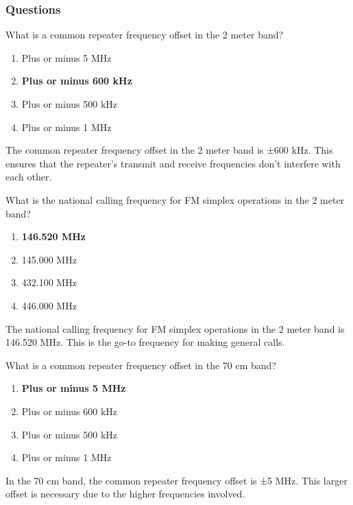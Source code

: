 \subsubsection{Questions}

\begin{tcolorbox}[colback=gray!10!white,colframe=black!75!black,title={T2A01}]
What is a common repeater frequency offset in the 2 meter band?
\begin{enumerate}[label=\Alph*),noitemsep]
    \item Plus or minus 5 MHz
    \item \textbf{Plus or minus 600 kHz}
    \item Plus or minus 500 kHz
    \item Plus or minus 1 MHz
\end{enumerate}
\end{tcolorbox}
The common repeater frequency offset in the 2 meter band is ±600 kHz. This ensures that the repeater’s transmit and receive frequencies don’t interfere with each other.

\begin{tcolorbox}[colback=gray!10!white,colframe=black!75!black,title={T2A02}]
What is the national calling frequency for FM simplex operations in the 2 meter band?
\begin{enumerate}[label=\Alph*),noitemsep]
    \item \textbf{146.520 MHz}
    \item 145.000 MHz
    \item 432.100 MHz
    \item 446.000 MHz
\end{enumerate}
\end{tcolorbox}
The national calling frequency for FM simplex operations in the 2 meter band is 146.520 MHz. This is the go-to frequency for making general calls.

\begin{tcolorbox}[colback=gray!10!white,colframe=black!75!black,title={T2A03}]
What is a common repeater frequency offset in the 70 cm band?
\begin{enumerate}[label=\Alph*),noitemsep]
    \item \textbf{Plus or minus 5 MHz}
    \item Plus or minus 600 kHz
    \item Plus or minus 500 kHz
    \item Plus or minus 1 MHz
\end{enumerate}
\end{tcolorbox}
In the 70 cm band, the common repeater frequency offset is ±5 MHz. This larger offset is necessary due to the higher frequencies involved.

